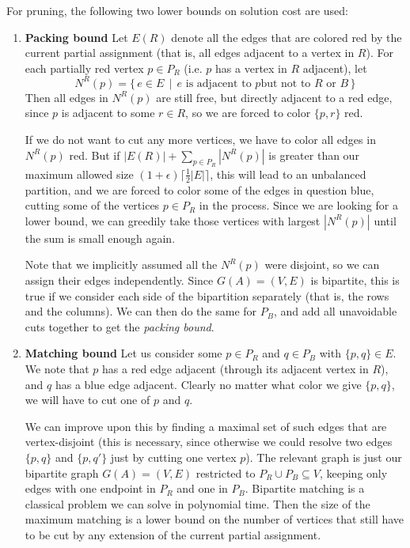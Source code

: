 	For pruning, the following two lower bounds on solution cost are used:
	\begin{enumerate}
		\item[] \textbf{Packing bound} Let $E(R)$ denote all the edges that
				are colored red by the current partial assignment (that is, all
				edges adjacent to a vertex in $R$).
				For each partially red vertex
				$p \in P_R$ (i.e. $p$ has a vertex in $R$ adjacent), let
				$$N^R(p) = \{\, e \in E \,\mid\, \text{$e$ is adjacent to $p$
				but not to $R$ or $B$}\,\}$$
				Then all edges in $N^R(p)$ are still free, but directly
				adjacent to a red edge, since $p$ is adjacent to some $r\in R$,
				so we are forced to color $\{p, r\}$ red.

				If we do not want to cut any more vertices, we have to color all
				edges in $N^R(p)$ red. But if
				$|E(R)| + \sum_{p\in P_R} |N^R(p)|$ is greater than our maximum
				allowed size $(1+\epsilon)\lceil\frac{1}{2}|E|\rceil$, this will
				lead to an unbalanced partition, and we are forced to color
				some of the edges in question blue, cutting some
				of the vertices $p \in P_R$ in the process.
				Since we are looking for a lower
				bound, we can greedily take those vertices with largest
				$|N^R(p)|$ until the sum is small enough again.

				Note that we implicitly assumed all the $N^R(p)$ were disjoint,
				so we can assign their edges independently. Since
				$G(A) = (V,E)$ is bipartite, this is true if we consider each
				side of the bipartition separately (that is, the rows and the
				columns). We can then do the same
				for $P_B$, and add all unavoidable cuts together to get the
				\textit{packing bound}.
		\item[] \textbf{Matching bound} Let us consider some $p \in P_R$ and
				$q \in P_B$ with $\{p, q\} \in E$. We note that $p$ has a red
				edge adjacent (through its adjacent vertex in $R$), and $q$ has
				a blue edge adjacent. Clearly no matter what color we give
				$\{p, q\}$, we will have to cut one of $p$ and $q$.

				We can improve upon this by finding a maximal set of such edges that
				are vertex-disjoint (this is necessary, since otherwise we could
				resolve two edges $\{p, q\}$ and $\{p, q'\}$ just by cutting one
				vertex $p$).
				The relevant graph is just our bipartite graph
				$G(A) = (V, E)$ restricted to
				$P_R \cup P_B \subseteq V$, keeping only edges with one
				endpoint in $P_R$ and one in $P_B$. Bipartite
				matching is a classical problem we can solve in polynomial
				time. Then the size of the maximum matching is a lower bound
				on the number of vertices that still have to be cut by any
				extension of the current partial assignment.
	\end{enumerate}

